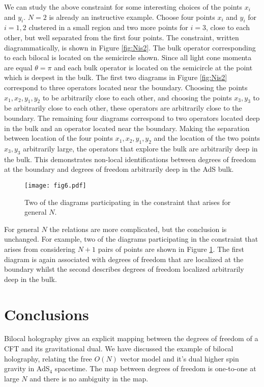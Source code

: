 \documentclass[a4paper,12pt]{article}
\begin{document}
We can study the above constraint for some interesting choices of the points $x_i$ and $y_i$.
$N=2$ is already an instructive example.
Choose four points $x_i$ and $y_i$ for $i=1,2$ clustered in a small region and two more points for $i=3$, close to each 
other, but well separated from the first four points. 
The constraint, written diagrammatically, is shown in Figure \ref{fig:Nis2}.
The bulk operator corresponding to each bilocal is located on the semicircle shown.
Since all light cone momenta are equal $\theta=\pi$ and each bulk operator is located on the semicircle at the point which is
deepest in the bulk.
The first two diagrams in Figure \ref{fig:Nis2} correspond to three operators located near the boundary.
Choosing the points $x_1,x_2,y_1,y_2$ to be arbitrarily close to each other, and choosing the points $x_3,y_3$ to be 
arbitrarily close to each other, these operators are arbitrarily close to the boundary.
The remaining four diagrams correspond to two operators located deep in the bulk and an operator located near the boundary.
Making the separation between location of the four points $x_1,x_2,y_1,y_2$ and the location of the two points $x_3,y_3$
arbitrarily large, the operators that explore the bulk are arbitrarily deep in the bulk.
This demonstrates non-local identifications between degrees of freedom at the boundary and degrees of freedom arbitrarily 
deep in the AdS bulk. 
%
\begin{figure}[h]%
\begin{center}
\texttt{[image: fig6.pdf]}%
\caption{Two of the diagrams participating in the constraint that arises for general $N$.}
\label{fig:N}
\end{center}
\end{figure}

For general $N$ the relations are more complicated, but the conclusion is unchanged.
For example, two of the diagrams participating in the constraint that arises from considering $N+1$ pairs of points are
shown in Figure \ref{fig:N}.
The first diagram is again associated with degrees of freedom that are localized at the boundary whilst the second describes
degrees of freedom localized arbitrarily deep in the bulk.

\section{Conclusions}\label{conclusions}

Bilocal holography gives an explicit mapping between the degrees of freedom of a CFT and its gravitational dual.
We have discussed the example of bilocal holography, relating the free $O(N)$ vector model and it's dual higher spin
gravity in AdS$_4$ spacetime.
The map between degrees of freedom is one-to-one at large $N$ and there is no ambiguity in the map.
\end{document}
